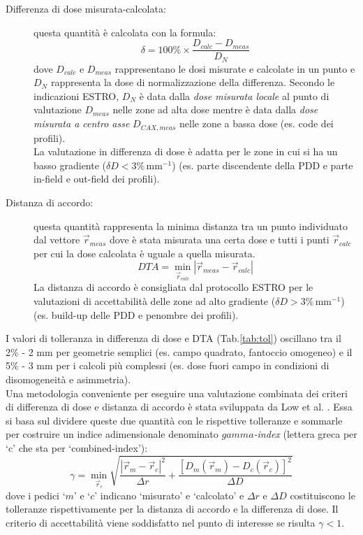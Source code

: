 \begin{description}

\item[Differenza di dose misurata-calcolata:] questa quantità è calcolata con la formula:
\begin{equation}
\delta = 100\% \times \frac{D_{calc} - D_{meas}}{D_{N}}
\end{equation}
dove $D_{calc}$ e $D_{meas}$ rappresentano le dosi misurate e calcolate in un punto e $D_N$ rappresenta la dose di normalizzazione della differenza. Secondo le indicazioni ESTRO, $D_N$ è data dalla \textit{dose misurata locale} al punto di valutazione $D_{meas}$ nelle zone ad alta dose mentre è data dalla \textit{dose misurata a centro asse}  $D_{CAX,meas}$ nelle zone a bassa dose (es. code dei profili).\\
La valutazione in differenza di dose è adatta per le zone in cui si ha un basso gradiente ($\delta D < 3\%\,$mm$^{-1}$) (es. parte discendente della PDD e parte in-field e out-field dei profili).

\item[Distanza di accordo:] questa quantità rappresenta la minima distanza tra un punto individuato dal vettore $\vec{r}_{meas}$ dove è stata misurata una certa dose e tutti i punti $\vec{r}_{calc}$ per cui la dose calcolata è  uguale a quella misurata.
\begin{equation}
DTA = \min_{\vec{r}_{calc}} \left|\vec{r}_{meas} - \vec{r}_{calc}\right|
\end{equation}
La distanza di accordo è consigliata dal protocollo ESTRO per le valutazioni di accettabilità delle zone ad alto gradiente ($\delta D > 3\%\,$mm$^{-1}$) (es. build-up delle PDD e penombre dei profili).
\end{description}

I valori di tolleranza in differenza di dose e DTA (Tab.\ref{tab:tol}) oscillano tra il 2\% - 2 mm per geometrie semplici (es. campo quadrato, fantoccio omogeneo) e il 5\% - 3 mm per i calcoli più complessi (es. dose fuori campo in condizioni di disomogeneità e asimmetria).\\
Una metodologia conveniente per eseguire una valutazione combinata dei criteri di differenza di dose e distanza di accordo è stata sviluppata da Low et al. \cite{Low1998}. Essa si basa sul dividere queste due quantità con le rispettive tolleranze e sommarle per costruire un indice adimensionale denominato \textit{$gamma$-index} (lettera greca per `c' che sta per `combined-index'):
\begin{equation}
\gamma = \min_{\vec{r}_{c}} \sqrt{\frac{|\vec{r}_{m}-\vec{r}_{c}|^2}{\Delta r}   + \frac{\left[D_{m}(\vec{r}_{m})-D_{c}(\vec{r}_{c})\right]^2}{\Delta D} }
\end{equation}
dove i pedici `$m$' e `$c$' indicano `misurato' e `calcolato' e $\Delta r$ e $\Delta D$ costituiscono le tolleranze rispettivamente per la distanza di accordo e la differenza di dose. Il criterio di accettabilità viene soddisfatto nel punto di interesse se risulta $\gamma < 1$.

